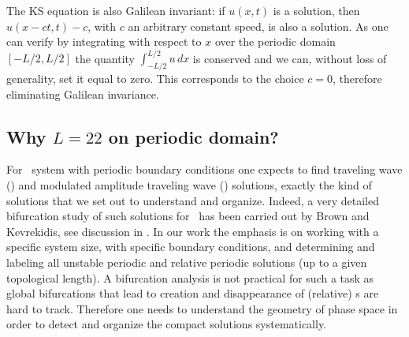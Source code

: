 The KS equation is also Galilean invariant: if $u(x,t)$ is a solution,
then $u(x -ct,t) -c $, with $c$ an arbitrary constant
speed, is also a solution. As one can verify by integrating  with
respect to $x$ over the periodic domain $[-L/2,L/2]$ the quantity
 $\int_{-L/2}^{L/2} u\,dx$
is conserved and we can, without loss of generality, set it equal to zero. This corresponds
to the choice $c=0$, therefore eliminating Galilean invariance.




\subsection{Why $L=22$ on periodic domain?}
\label{sec:ksSizeBC}

For \KS\ system with periodic boundary conditions one expects to find
traveling wave (\reqv) and modulated amplitude traveling wave
(\rpo) solutions, exactly the kind of
solutions that we set out to understand and organize. Indeed,
a very detailed bifurcation study of such solutions for \KSe\
has been carried out by Brown and Kevrekidis,
see discussion in . In our work the emphasis is
on working with a specific system size, with specific boundary
conditions, and determining and labeling all unstable periodic
and relative periodic solutions (up to a given topological
length). A bifurcation analysis is not practical for
such a task as global bifurcations that lead to creation and
disappearance of (relative) \po s are hard to track.
Therefore one needs to understand the geometry of phase space
in order to detect and organize the compact solutions
systematically.

